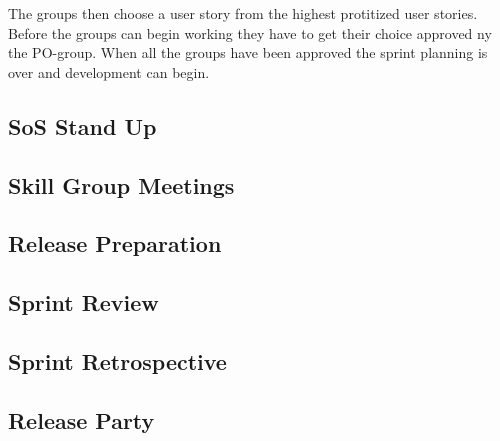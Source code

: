 The groups then choose a user story from the highest protitized user stories.
Before the groups can begin working they have to get their choice approved ny the PO-group.
When all the groups have been approved the sprint planning is over and development can begin.




\subsection{SoS Stand Up}

\subsection{Skill Group Meetings}

\subsection{Release Preparation}

\subsection{Sprint Review}

\subsection{Sprint Retrospective}

\subsection{Release Party}


